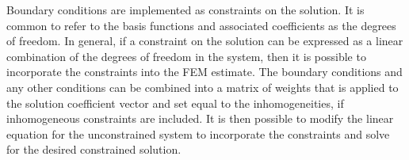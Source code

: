 Boundary conditions are implemented as constraints on the solution.
It is common to refer to the basis functions and associated coefficients as the degrees of freedom.
In general, if a constraint on the solution can be expressed as a linear combination of the degrees of freedom in the system, then it is possible to incorporate the constraints into the \ac{FEM} estimate.
The boundary conditions and any other conditions can be combined into a matrix of weights that is applied to the solution coefficient vector and set equal to the inhomogeneities, if inhomogeneous constraints are included.
It is then possible to modify the linear equation for the unconstrained system to incorporate the constraints and solve for the desired constrained solution.

